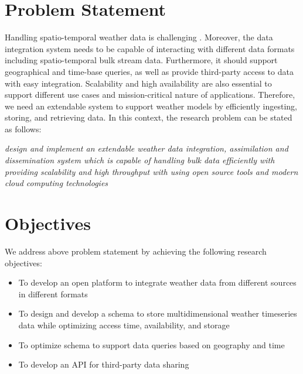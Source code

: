 \section{Problem Statement}
Handling spatio-temporal weather data is challenging . Moreover, the data integration system needs to be capable of interacting with different data formats including spatio-temporal bulk stream data. Furthermore, it should support geographical and time-base queries, as well as provide third-party access to data with easy integration. Scalability and high availability are also essential to support different use cases and mission-critical nature of applications. Therefore, we need an extendable system to support weather models by efficiently ingesting, storing, and retrieving data. In this context, the research problem can be stated as follows:
 
\emph{design and implement an extendable weather data integration, assimilation and dissemination system which is capable of handling bulk data efficiently with providing scalability and high throughput with using open source tools and modern cloud computing technologies}

\section{Objectives}
We address above problem statement by achieving the following research objectives:
\begin{itemize}
    \item To develop an open platform to integrate weather data from different sources in different formats
    \item To design and develop a schema to store multidimensional weather timeseries data while optimizing access time, availability, and storage
    \item To optimize schema to support data queries based on geography and time
    \item To develop an API for third-party data sharing
\end{itemize}
